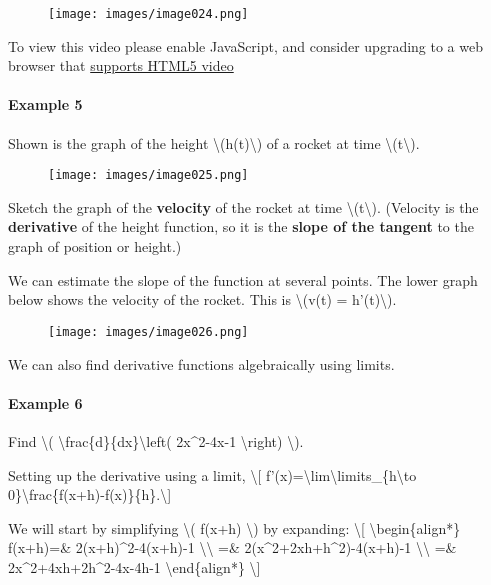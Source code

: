\begin{figure}
\centering
\texttt{[image: images/image024.png]}
\caption{}
\end{figure}

To view this video please enable JavaScript, and consider upgrading to a
web browser that \href{http://videojs.com/html5-video-support/}{supports
HTML5 video}

\hypertarget{example-5}{%
\paragraph{Example 5}\label{example-5}}

Shown is the graph of the height \textbackslash{}(h(t)\textbackslash{})
of a rocket at time \textbackslash{}(t\textbackslash{}).

\begin{figure}
\centering
\texttt{[image: images/image025.png]}
\caption{}
\end{figure}

Sketch the graph of the \textbf{velocity} of the rocket at time
\textbackslash{}(t\textbackslash{}). (Velocity is the
\textbf{derivative} of the height function, so it is the \textbf{slope
of the tangent} to the graph of position or height.)

We can estimate the slope of the function at several points. The lower
graph below shows the velocity of the rocket. This is
\textbackslash{}(v(t) = h'(t)\textbackslash{}).

\begin{figure}
\centering
\texttt{[image: images/image026.png]}
\caption{}
\end{figure}

We can also find derivative functions algebraically using limits.

\hypertarget{example-6}{%
\paragraph{Example 6}\label{example-6}}

Find \textbackslash{}(
\textbackslash{}frac\{d\}\{dx\}\textbackslash{}left( 2x\^{}2-4x-1
\textbackslash{}right) \textbackslash{}).

Setting up the derivative using a limit, \textbackslash{}{[}
f'(x)=\textbackslash{}lim\textbackslash{}limits\_\{h\textbackslash{}to
0\}\textbackslash{}frac\{f(x+h)-f(x)\}\{h\}.\textbackslash{}{]}

We will start by simplifying \textbackslash{}( f(x+h) \textbackslash{})
by expanding: \textbackslash{}{[} \textbackslash{}begin\{align*\}
f(x+h)=\& 2(x+h)\^{}2-4(x+h)-1 \textbackslash{}\textbackslash{} =\&
2(x\^{}2+2xh+h\^{}2)-4(x+h)-1 \textbackslash{}\textbackslash{} =\&
2x\^{}2+4xh+2h\^{}2-4x-4h-1 \textbackslash{}end\{align*\}
\textbackslash{}{]}

